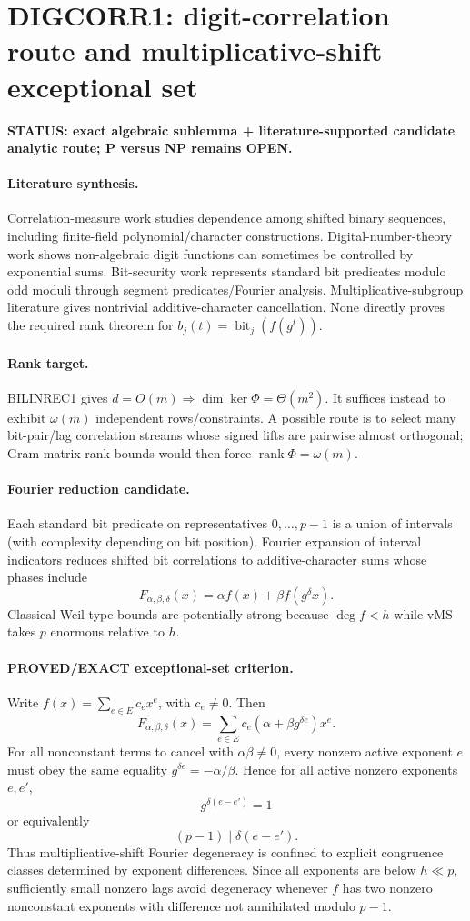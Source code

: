 \documentclass[11pt]{article}\usepackage[margin=.88in]{geometry}\usepackage{amsmath,amssymb}
\begin{document}
\section*{DIGCORR1: digit-correlation route and multiplicative-shift exceptional set}
\textbf{STATUS: exact algebraic sublemma + literature-supported candidate analytic route; P versus NP remains OPEN.}
\paragraph{Literature synthesis.}
Correlation-measure work studies dependence among shifted binary sequences, including finite-field polynomial/character constructions. Digital-number-theory work shows non-algebraic digit functions can sometimes be controlled by exponential sums. Bit-security work represents standard bit predicates modulo odd moduli through segment predicates/Fourier analysis. Multiplicative-subgroup literature gives nontrivial additive-character cancellation. None directly proves the required rank theorem for \(b_j(t)=\operatorname{bit}_j(f(g^t))\).
\paragraph{Rank target.}
BILINREC1 gives \(d=O(m)\Rightarrow\dim\ker\Phi=\Theta(m^2)\). It suffices instead to exhibit \(\omega(m)\) independent rows/constraints. A possible route is to select many bit-pair/lag correlation streams whose signed lifts are pairwise almost orthogonal; Gram-matrix rank bounds would then force \(\operatorname{rank}\Phi=\omega(m)\).
\paragraph{Fourier reduction candidate.}
Each standard bit predicate on representatives \(0,\ldots,p-1\) is a union of intervals (with complexity depending on bit position). Fourier expansion of interval indicators reduces shifted bit correlations to additive-character sums whose phases include
\[
F_{\alpha,\beta,\delta}(x)=\alpha f(x)+\beta f(g^\delta x).
\]
Classical Weil-type bounds are potentially strong because \(\deg f<h\) while vMS takes \(p\) enormous relative to \(h\).
\paragraph{PROVED/EXACT exceptional-set criterion.}
Write \(f(x)=\sum_{e\in E}c_ex^e\), with \(c_e\ne0\). Then
\[
F_{\alpha,\beta,\delta}(x)=\sum_{e\in E}c_e(\alpha+\beta g^{\delta e})x^e.
\]
For all nonconstant terms to cancel with \(\alpha\beta\ne0\), every nonzero active exponent \(e\) must obey the same equality \(g^{\delta e}=-\alpha/\beta\). Hence for all active nonzero exponents \(e,e'\),
\[
\boxed{g^{\delta(e-e')}=1}
\]
or equivalently
\[
\boxed{(p-1)\mid\delta(e-e')}.
\]
Thus multiplicative-shift Fourier degeneracy is confined to explicit congruence classes determined by exponent differences. Since all exponents are below \(h\ll p\), sufficiently small nonzero lags avoid degeneracy whenever \(f\) has two nonzero nonconstant exponents with difference not annihilated modulo \(p-1\).
\end{document}
